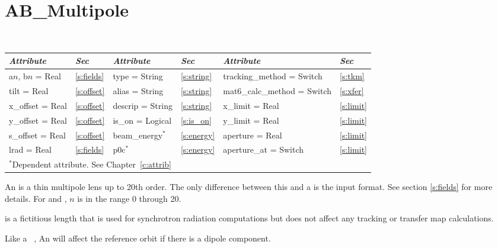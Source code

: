 \vfil
\break

\section{AB\_Multipole}
\label{s:ab_m}

\begin{center}
\tt 
\begin{tabular}{|l|l||l|l||l|l|} \hline
  {\sl Attribute} & {\sl Sec}  & {\sl Attribute} & {\sl Sec} & {\sl Attribute} & {\sl Sec} \\ \hline
  a$n$, b$n$ = Real  &  \ref{s:fields} &  type = String    & \ref{s:string} & tracking\_method = Switch    & \ref{s:tkm}   \\ \hline
  tilt       = Real  &  \ref{s:offset} &  alias = String   & \ref{s:string} & mat6\_calc\_method = Switch  & \ref{s:xfer}  \\ \hline
  x\_offset  = Real  &  \ref{s:offset} &  descrip = String & \ref{s:string} & x\_limit = Real              & \ref{s:limit} \\ \hline
  y\_offset  = Real  &  \ref{s:offset} &  is\_on = Logical & \ref{s:is_on}  & y\_limit = Real              & \ref{s:limit} \\ \hline
  s\_offset  = Real  &  \ref{s:offset} &  beam\_energy$^*$ & \ref{s:energy} & aperture = Real              & \ref{s:limit} \\ \hline
  lrad       = Real  &  \ref{s:fields} &  p0c$^*$          & \ref{s:energy} & aperture\_at = Switch        & \ref{s:limit} \\ \hline
  \multicolumn{6}{l}{\small $^*$Dependent attribute. See Chapter~\ref{c:attrib}} \\
\end{tabular}
\end{center}
\toffset

An  is a thin multipole lens up to 20th order. The only
difference between this and a  is the input format. See
section \ref{s:fields} for more details. For 
and , $n$ is in the range 0 through 20.

 is a fictitious length that is used for synchrotron radiation
computations but does not affect any tracking or transfer map calculations. 

Like a \mad\ , An  will affect the
reference orbit if there is a dipole component. 

